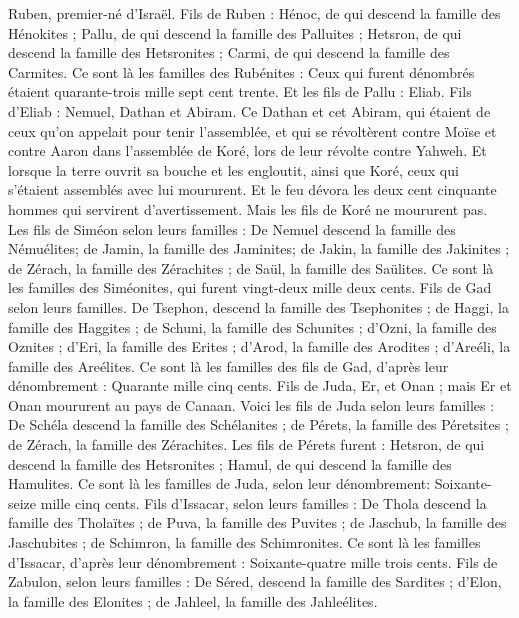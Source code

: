 \begin{multicols}{2}
Ruben, premier-né d'Israël. Fils de Ruben : Hénoc, de qui descend la famille des Hénokites ; Pallu, de qui descend la famille des Palluites ;
Hetsron, de qui descend la famille des Hetsronites ; Carmi, de qui descend la famille des Carmites.
Ce sont là les familles des Rubénites : Ceux qui furent dénombrés étaient quarante-trois mille sept cent trente.
Et les fils de Pallu : Eliab.
Fils d'Eliab : Nemuel, Dathan et Abiram. Ce Dathan et cet Abiram, qui étaient de ceux qu'on appelait pour tenir l'assemblée, et qui se révoltèrent contre Moïse et contre Aaron dans l'assemblée de Koré, lors de leur révolte contre Yahweh.
Et lorsque la terre ouvrit sa bouche et les engloutit, ainsi que Koré, ceux qui s'étaient assemblés avec lui moururent. Et le feu dévora les deux cent cinquante hommes qui servirent d'avertissement.
Mais les fils de Koré ne moururent pas.
Les fils de Siméon selon leurs familles : De Nemuel descend la famille des Némuélites; de Jamin, la famille des Jaminites; de Jakin, la famille des Jakinites ;
de Zérach, la famille des Zérachites ; de Saül, la famille des Saülites.
Ce sont là les familles des Siméonites, qui furent vingt-deux mille deux cents.
Fils de Gad selon leurs familles. De Tsephon, descend la famille des Tsephonites ; de Haggi, la famille des Haggites ; de Schuni, la famille des Schunites ;
d'Ozni, la famille des Oznites ; d'Eri, la famille des Erites ;
d'Arod, la famille des Arodites ; d'Areéli, la famille des Areélites.
Ce sont là les familles des fils de Gad, d'après leur dénombrement : Quarante mille cinq cents.
Fils de Juda, Er, et Onan ; mais Er et Onan moururent au pays de Canaan.
Voici les fils de Juda selon leurs familles : De Schéla descend la famille des Schélanites ; de Pérets, la famille des Péretsites ; de Zérach, la famille des Zérachites.
Les fils de Pérets furent : Hetsron, de qui descend la famille des Hetsronites ; Hamul, de qui descend la famille des Hamulites.
Ce sont là les familles de Juda, selon leur dénombrement: Soixante-seize mille cinq cents.
Fils d'Issacar, selon leurs familles : De Thola descend la famille des Tholaïtes ; de Puva, la famille des Puvites ;
de Jaschub, la famille des Jaschubites ; de Schimron, la famille des Schimronites.
Ce sont là les familles d'Issacar, d'après leur dénombrement : Soixante-quatre mille trois cents.
Fils de Zabulon, selon leurs familles : De Séred, descend la famille des Sardites ; d'Elon, la famille des Elonites ; de Jahleel, la famille des Jahleélites.

\end{multicols}
